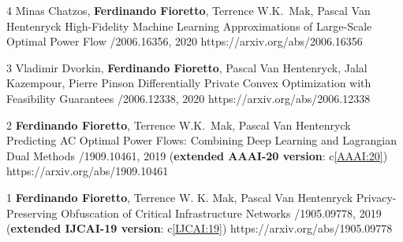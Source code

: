 \begin{pubs}
\wsentry
	{4}%
	{Minas Chatzos, {\bf Ferdinando Fioretto}, Terrence W.K.~Mak, Pascal Van Hentenryck}
	{High-Fidelity Machine Learning Approximations of Large-Scale Optimal Power Flow}
	{/2006.16356, 2020}
	{https://arxiv.org/abs/2006.16356}

\wsentry
	{3}%
	{Vladimir Dvorkin, {\bf Ferdinando Fioretto}, Pascal Van Hentenryck, Jalal Kazempour, Pierre Pinson}
	{Differentially Private Convex Optimization with Feasibility Guarantees}
	{/2006.12338, 2020}
	{https://arxiv.org/abs/2006.12338}

\wsentry
	{2}%
	{{\bf Ferdinando Fioretto}, Terrence W.K.~Mak, Pascal Van Hentenryck}
	{Predicting AC Optimal Power Flows: Combining Deep Learning and Lagrangian Dual Methods}
	{/1909.10461, 2019 ({\bf extended AAAI-20 version}: c\ref{AAAI:20})}
	{https://arxiv.org/abs/1909.10461}

\wsentry
	{1}%
	{{\bf Ferdinando Fioretto}, Terrence W. K. Mak, Pascal Van Hentenryck}
	{Privacy-Preserving Obfuscation of Critical Infrastructure Networks} 
	{/1905.09778, 2019 ({\bf extended IJCAI-19 version}: c\ref{IJCAI:19})}
	{https://arxiv.org/abs/1905.09778}

\end{pubs}


